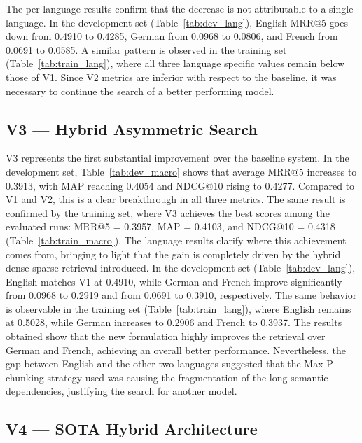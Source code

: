 \noindent The per language results confirm that the decrease is not attributable to a single language. In the development set (Table~\ref{tab:dev_lang}), English MRR@5 goes down from 0.4910 to 0.4285, German from 0.0968 to 0.0806, and French from 0.0691 to 0.0585. A similar pattern is observed in the training set (Table~\ref{tab:train_lang}), where all three language specific values remain below those of V1. Since V2 metrics are inferior with respect to the baseline, it was necessary to continue the search of a better performing model.


\subsection{V3 — Hybrid Asymmetric Search}

V3 represents the first substantial improvement over the baseline system. In the development set, Table~\ref{tab:dev_macro} shows that average MRR@5 increases to 0.3913, with MAP reaching 0.4054 and NDCG@10 rising to 0.4277. Compared to V1 and V2, this is a clear breakthrough in all three metrics. The same result is confirmed by the training set, where V3 achieves the best scores among the evaluated runs: 
MRR@5 = 0.3957, MAP = 0.4103, and NDCG@10 = 0.4318 (Table~\ref{tab:train_macro}). 
\noindent The language results clarify where this achievement comes from, bringing to light that the gain is completely driven by the hybrid dense-sparse retrieval introduced. In the development set (Table~\ref{tab:dev_lang}), English matches V1 at 0.4910, while German and French improve significantly from 0.0968 to 0.2919 and from 0.0691 to 0.3910, respectively. The same behavior is observable in the training set (Table~\ref{tab:train_lang}), where English remains at 0.5028, while German increases to 0.2906 and French to 0.3937. The results obtained show that the new formulation highly improves the retrieval over German and French, achieving an overall better performance. Nevertheless, the gap between English and the other two languages suggested that the Max-P chunking strategy used was causing the fragmentation of the long semantic dependencies, justifying the search for another model.

\subsection{V4 — SOTA Hybrid Architecture}

